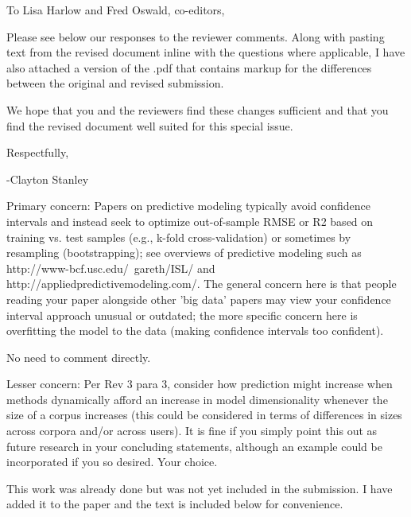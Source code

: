 \documentclass[answers,12pt]{exam}
\begin{document}
To Lisa	Harlow and Fred	Oswald,	co-editors, \bigskip

Please see below our responses to the reviewer comments.
Along with pasting text from the revised document inline with the questions where applicable,
I have also attached a version of the .pdf that contains markup for the differences between the original and revised submission. \bigskip 

We hope that you and the reviewers find these changes sufficient and that you find the revised document well suited for this special issue. \bigskip

Respectfully,

-Clayton Stanley

\bigskip
\bigskip

\begin{questions}

\question Primary concern: Papers on predictive modeling typically avoid confidence intervals and instead seek to optimize out-of-sample RMSE or R2 based on training vs. test samples (e.g., k-fold cross-validation) or sometimes by resampling (bootstrapping); see overviews of predictive modeling such as http://www-bcf.usc.edu/~gareth/ISL/ and http://appliedpredictivemodeling.com/.  The general concern here is that people reading your paper alongside other 'big data' papers may view your confidence interval approach unusual or outdated; the more specific concern here is overfitting the model to the data (making confidence intervals too confident).

\begin{solution}
No need to comment directly.
\end{solution}

\question Lesser concern: Per Rev 3 para 3, consider how prediction might increase when methods dynamically afford an increase in model dimensionality whenever the size of a corpus increases (this could be considered in terms of differences in sizes across corpora and/or across users). It is fine if you simply point this out as future research in your concluding statements, although an example could be incorporated if you so desired. Your choice.

\begin{solution}
This work was already done but was not yet included in the submission.
I have added it to the paper and the text is included below for convenience.





\end{solution}


\end{questions}
\end{document}
